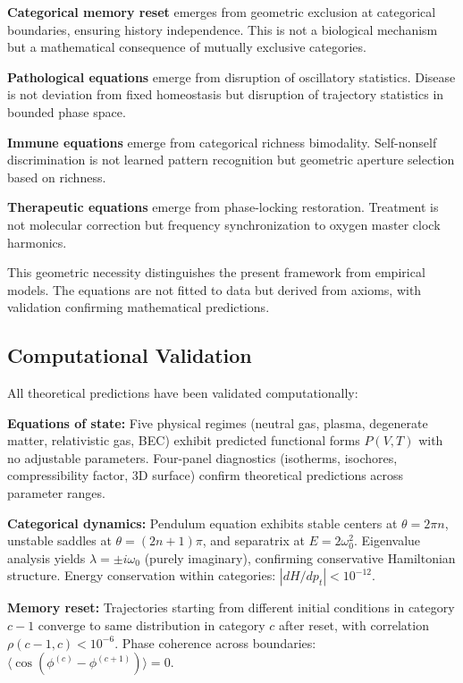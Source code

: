 \documentclass[12pt,a4paper]{article}
\theoremstyle{definition}
\theoremstyle{remark}
\begin{document}
\textbf{Categorical memory reset} emerges from geometric exclusion at categorical boundaries, ensuring history independence. This is not a biological mechanism but a mathematical consequence of mutually exclusive categories.

\textbf{Pathological equations} emerge from disruption of oscillatory statistics. Disease is not deviation from fixed homeostasis but disruption of trajectory statistics in bounded phase space.

\textbf{Immune equations} emerge from categorical richness bimodality. Self-nonself discrimination is not learned pattern recognition but geometric aperture selection based on richness.

\textbf{Therapeutic equations} emerge from phase-locking restoration. Treatment is not molecular correction but frequency synchronization to oxygen master clock harmonics.

This geometric necessity distinguishes the present framework from empirical models. The equations are not fitted to data but derived from axioms, with validation confirming mathematical predictions.

\subsection{Computational Validation}

All theoretical predictions have been validated computationally:

\textbf{Equations of state:} Five physical regimes (neutral gas, plasma, degenerate matter, relativistic gas, BEC) exhibit predicted functional forms $P(V,T)$ with no adjustable parameters. Four-panel diagnostics (isotherms, isochores, compressibility factor, 3D surface) confirm theoretical predictions across parameter ranges.

\textbf{Categorical dynamics:} Pendulum equation exhibits stable centers at $\theta = 2\pi n$, unstable saddles at $\theta = (2n+1)\pi$, and separatrix at $E = 2\omega_0^2$. Eigenvalue analysis yields $\lambda = \pm i\omega_0$ (purely imaginary), confirming conservative Hamiltonian structure. Energy conservation within categories: $|dH/dp_t| < 10^{-12}$.

\textbf{Memory reset:} Trajectories starting from different initial conditions in category $c-1$ converge to same distribution in category $c$ after reset, with correlation $\rho(c-1,c) < 10^{-6}$. Phase coherence across boundaries: $\langle\cos(\phi^{(c)} - \phi^{(c+1)})\rangle = 0$.
\end{document}
